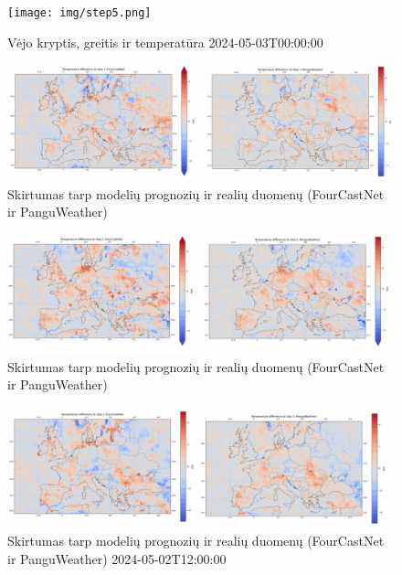 \documentclass[conference]{IEEEtran}
\begin{document}
\begin{figure}[htb!] %
\centerline{\texttt{[image: img/step5.png]}}
\caption{Vėjo kryptis, greitis ir temperatūra 2024-05-03T00:00:00}
\label{fig9}
\end{figure}


\begin{figure}[htb!] %
\centerline{\includegraphics[width=\textwidth]{img/diffstep1.png}}
\caption{Skirtumas tarp modelių prognozių ir realių duomenų (FourCastNet ir PanguWeather)}
\label{fig10}
\end{figure}

\begin{figure}[htb!] %
\centerline{\includegraphics[width=\textwidth]{img/diffstep2.png}}
\caption{Skirtumas tarp modelių prognozių ir realių duomenų (FourCastNet ir PanguWeather)}
\label{fig11}
\end{figure}


\begin{figure}[htb!] %
\centerline{\includegraphics[width=\textwidth]{img/diffstep3.png}}
\caption{Skirtumas tarp modelių prognozių ir realių duomenų (FourCastNet ir PanguWeather) 2024-05-02T12:00:00}
\label{fig12}
\end{figure}
\end{document}
